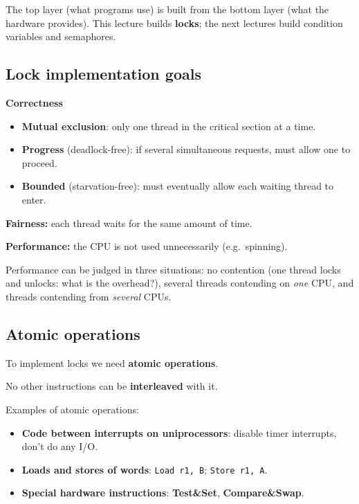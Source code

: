 \documentclass[11pt,a4paper]{article}
\begin{document}
The top layer (what programs use) is built from the bottom layer (what the
hardware provides). This lecture builds \textbf{locks}; the next lectures
build condition variables and semaphores.

\subsection{Lock implementation goals}

\begin{defbox}[Goals]
\textbf{Correctness}
\begin{itemize}
  \item \textbf{Mutual exclusion}: only one thread in the critical section
        at a time.
  \item \textbf{Progress} (deadlock-free): if several simultaneous
        requests, must allow one to proceed.
  \item \textbf{Bounded} (starvation-free): must eventually allow each
        waiting thread to enter.
\end{itemize}
\textbf{Fairness:} each thread waits for the same amount of time.

\textbf{Performance:} the CPU is not used unnecessarily (e.g.\ spinning).
\end{defbox}

Performance can be judged in three situations: no contention (one thread
locks and unlocks: what is the overhead?), several threads contending on
\emph{one} CPU, and threads contending from \emph{several} CPUs.

\subsection{Atomic operations}

To implement locks we need \textbf{atomic operations}.

\begin{defbox}
No other instructions can be \textbf{interleaved} with it.
\end{defbox}

Examples of atomic operations:
\begin{itemize}
  \item \textbf{Code between interrupts on uniprocessors}: disable timer
        interrupts, don't do any I/O.
  \item \textbf{Loads and stores of words}: \texttt{Load r1, B};
        \texttt{Store r1, A}.
  \item \textbf{Special hardware instructions}: \textbf{Test\&Set},
        \textbf{Compare\&Swap}.
\end{itemize}
\end{document}
